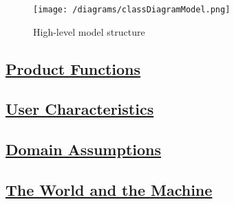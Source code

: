 	\begin{figure}[h!]
		\centering
		\texttt{[image: /diagrams/classDiagramModel.png]}
		\caption{\label{fig:classDiagram}High-level model structure}
	\end{figure}

\subsection[Product Functions]{\hyperlink{toc}{Product Functions}}

\subsection[User Characteristics]{\hyperlink{toc}{User Characteristics}}

\subsection[Domain Assumptions]{\hyperlink{toc}{Domain Assumptions}}

\subsection[The World and the Machine]{\hyperlink{toc}{The World and the Machine}}